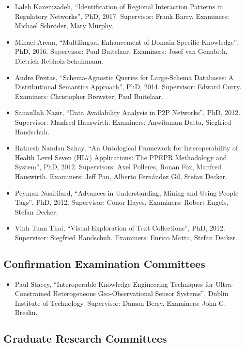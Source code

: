 \documentclass[10pt,a4paper]{res} %
\begin{document}
\begin{resume}
\begin{itemize} \itemsep -2pt
\item Laleh Kazemzadeh, ``Identification of Regional Interaction Patterns in Regulatory Networks'', PhD, 2017. Supervisor: Frank Barry. Examiners: Michael Schr\"{o}der, Mary Murphy.
\item Mihael Arcan, ``Multilingual Enhancement of Domain-Specific Knowledge'', PhD, 2016. Supervisor: Paul Buitelaar. Examiners: Josef van Genabith, Dietrich Rebholz-Schuhmann.
\item Andre Freitas, ``Schema-Agnostic Queries for Large-Schema Databases: A Distributional Semantics Approach'', PhD, 2014. Supervisor: Edward Curry. Examiners: Christopher Brewster, Paul Buitelaar.
\item Sanaullah Nazir, ``Data Availability Analysis in P2P Networks'', PhD, 2012. Supervisor: Manfred Hauswirth. Examiners: Anwitaman Datta, Siegfried Handschuh.
\item Ratnesh Nandan Sahay, ``An Ontological Framework for Interoperability of Health Level Seven (HL7) Applications: The PPEPR Methodology and System'', PhD, 2012. Supervisors: Axel Polleres, Ronan Fox, Manfred Hauswirth. Examiners: Jeff Pan, Alberto Fern\'{a}ndez Gil, Stefan Decker.
\item Peyman Nasirifard, ``Advances in Understanding, Mining and Using People Tags'', PhD, 2012. Supervisor: Conor Hayes. Examiners: Robert Engels, Stefan Decker.
\item Vinh Tuan Thai, ``Visual Exploration of Text Collections'', PhD, 2012. Supervisor: Siegfried Handschuh. Examiners: Enrico Motta, Stefan Decker.
\end{itemize}

\subsection*{Confirmation Examination Committees}

\begin{itemize} \itemsep -2pt
\item Paul Stacey, ``Interoperable Knowledge Engineering Techniques for Ultra-Constrained Heterogeneous Geo-Observational Sensor Systems'', Dublin Institute of Technology. Supervisor: Damon Berry. Examiners: John G. Breslin.
\end{itemize}

\subsection*{Graduate Research Committees}


\end{resume}
\end{document}
